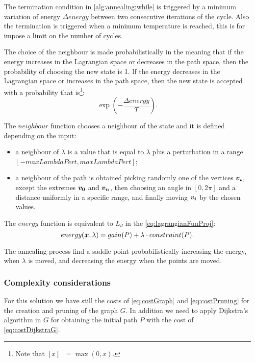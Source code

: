 \documentclass[dissertation.tex]{subfiles}
\begin{document}
The termination condition in \cref{alg:annealing:while} is triggered by a
minimum variation of energy $\Delta energy$ between two consecutive
iterations of the cycle. Also the termination is triggered when a
minimum temperature is reached, this is for impose a limit on the
number of cycles.

The choice of the neighbour is made
probabilistically in the meaning that if the energy increases in the
Lagrangian space or decreases in the path space, then the probability of
choosing the new state is 1. If the energy decreases in the Lagrangian
space or increases in the path space, then the new state is accepted
with a probability that is\footnote{Note that $[x]^+=\max(0,x)$.}:
$$\exp(-\frac{\Delta energy}{T}).$$

The $neighbour$ function chooses a neighbour of the state and it is
defined depending on the input:
\begin{itemize}
  \item a neighbour of $\lambda$ is a value that is equal to $\lambda$
    plus a perturbation in a range $[-maxLambdaPert, maxLambdaPert]$;
  \item a neighbour of the path is obtained picking randomly one of
    the vertices $\boldsymbol{v_i}$, except the extremes $\boldsymbol{v_0}$ and $\boldsymbol{v_n}$,
    then choosing an angle in $[0,2\pi]$ and a distance
    uniformly in a specific range, and finally moving $\boldsymbol{v_i}$ by
    the chosen values.
\end{itemize}

The $energy$ function is equivalent to $L_d$ in the
\cref{eq:lagrangianFunProj}:
\begin{equation}
  \label{eq:annealingEnergy}
  energy(\boldsymbol{x},\lambda)=gain(P)+\lambda\cdot constraint(P).
\end{equation}

The annealing process
find a saddle point probabilistically increasing the energy, when
$\lambda$ is moved, and 
decreasing the energy when the points are moved.

\subsubsection{Complexity considerations}
For this solution we have still the costs of \cref{eq:costGraph} and
\cref{eq:costPruning} for
the creation and pruning of the graph $G$. In addition we need to
apply Dijkstra's
algorithm in $G$ for obtaining the initial path $P$ with the cost of
\cref{eq:costDijkstraG}.
\end{document}

